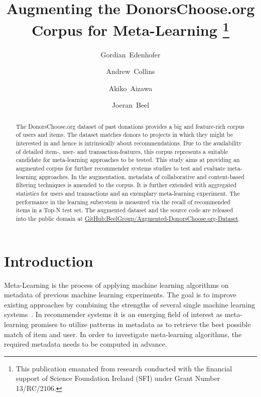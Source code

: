 \documentclass[runningheads]{llncs}
\begin{document}
\title{Augmenting the DonorsChoose.org Corpus for Meta-Learning%
	\thanks{This publication emanated from research conducted with the financial support of Science Foundation Ireland (SFI) under Grant Number 13/RC/2106.}}
\author{Gordian~Edenhofer \and Andrew~Collins \and Akiko~Aizawa \and Joeran~Beel}

\maketitle  %
\markboth{}{}  %

\begin{abstract}
The DonorsChoose.org dataset of past donations provides a big and feature-rich corpus of users and items. The dataset matches donors to projects in which they might be interested in and hence is intrinsically about recommendations. Due to the availability of detailed item-, user- and transaction-features, this corpus represents a suitable candidate for meta-learning approaches to be tested. This study aims at providing an augmented corpus for further recommender systems studies to test and evaluate meta-learning approaches. In the augmentation, metadata of collaborative and content-based filtering techniques is amended to the corpus. It is further extended with aggregated statistics for users and transactions and an exemplary meta-learning experiment. The performance in the learning subsystem is measured via the recall of recommended items in a Top-N test set. The augmented dataset and the source code are released into the public domain at \href{https://github.com/BeelGroup/Augmented-DonorsChoose.org-Dataset}{GitHub:BeelGroup/Augmented-DonorsChoose.org-Dataset}.

\end{abstract}

\section{Introduction}
Meta-Learning is the process of applying machine learning algorithms on metadata of previous machine learning experiments. The goal is to improve existing approaches by combining the strengths of several single machine learning systems~\cite{AIR:MetalearningSurveyOfTrendsAndTechnologiesLemke2015}. In recommender systems it is an emerging field of interest as meta-learning promises to utilize patterns in metadata as to retrieve the best possible match of item and user. In order to investigate meta-learning algorithms, the required metadata needs to be computed in advance.
\end{document}
